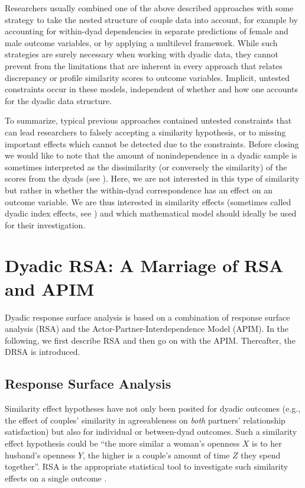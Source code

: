 \documentclass[jou,a4paper,draftfirst]{apa6}
\begin{document}
Researchers usually combined one of the above described approaches with some strategy to take the nested structure of couple data into account, for example by accounting for within-dyad dependencies in separate predictions of female and male outcome variables, or by applying a multilevel framework. While such strategies are surely necessary when working with dyadic data, they cannot prevent from the limitations that are inherent in every approach that relates discrepancy or profile similarity scores to outcome variables. Implicit, untested constraints occur in these models, independent of whether and how one accounts for the dyadic data structure. 

To summarize, typical previous approaches contained untested constraints that can lead researchers to falsely accepting a similarity hypothesis, or to missing important effects which cannot be detected due to the constraints. Before closing we would like to note that the amount of nonindependence in a dyadic sample is sometimes interpreted as the dissimilarity (or conversely the similarity) of the scores from the dyads (see ). Here, we are not interested in this type of similarity but rather in whether the within-dyad correspondence has an effect on an outcome variable. We are thus interested in similarity effects (sometimes called dyadic index effects, see ) and which mathematical model should ideally be used for their investigation.


\section{Dyadic RSA: A Marriage of RSA and APIM}
Dyadic response surface analysis is based on a combination of response surface analysis (RSA) and the Actor-Partner-Interdependence Model (APIM). In the following, we first describe RSA and then go on with the APIM. Thereafter, the DRSA is introduced. 

\subsection{Response Surface Analysis}

Similarity effect hypotheses have not only been posited for dyadic outcomes (e.g., the effect of couples' similarity in agreeableness on \emph{both} partners' relationship satisfaction) but also for individual or between-dyad outcomes. Such a similarity effect hypothesis could be ``the more similar a woman's openness $X$ is to her husband's openness $Y$, the higher is a couple's amount of time $Z$ they spend together''. RSA is the appropriate statistical tool to investigate such similarity effects on a single outcome \parencite[e.g., see][]{edwards_alternatives_2002,edwards_relationship_2007,HumbergRSA, schonbrodt_testing_2016}. 
\end{document}

